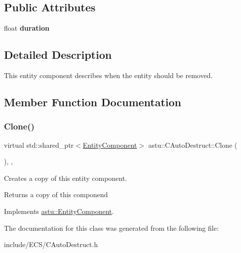 \subsection*{Public Attributes}
\begin{DoxyCompactItemize}
\item 
\mbox{\label{classastu_1_1CAutoDestruct_aebb5078e1e061e1c3dcbe82d1c949c58}} 
float {\bfseries duration}
\end{DoxyCompactItemize}


\subsection{Detailed Description}
This entity component describes when the entity should be removed. 

\subsection{Member Function Documentation}
\mbox{\label{classastu_1_1CAutoDestruct_a25a9d187d42fbc3fd16311f74894b345}} 
\subsubsection{\texorpdfstring{Clone()}{Clone()}}
{\footnotesize\ttfamily virtual std\+::shared\+\_\+ptr$<$\hyperlink{classastu_1_1EntityComponent}{Entity\+Component}$>$ astu\+::\+C\+Auto\+Destruct\+::\+Clone (\begin{DoxyParamCaption}{ }\end{DoxyParamCaption})\hspace{0.3cm}{\ttfamily [inline]}, {\ttfamily [override]}, {\ttfamily [virtual]}}

Creates a copy of this entity component.

\begin{DoxyReturn}{Returns}
a copy of this componend 
\end{DoxyReturn}


Implements \hyperlink{classastu_1_1EntityComponent_afeddb5a899d831255a9a4f07269f3b2d}{astu\+::\+Entity\+Component}.



The documentation for this class was generated from the following file\+:\begin{DoxyCompactItemize}
\item 
include/\+E\+C\+S/C\+Auto\+Destruct.\+h\end{DoxyCompactItemize}
